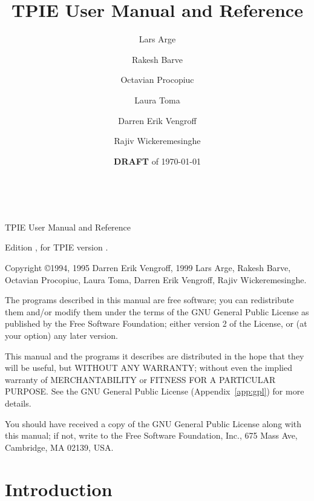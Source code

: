 


\title{TPIE User Manual and Reference}
\author{Lars Arge \and Rakesh Barve \and Octavian Procopiuc \and Laura
Toma\and 
        Darren Erik Vengroff \and Rajiv Wickeremesinghe}
\date{{\bf DRAFT} of \today}

\maketitle

\begin{titlepage}

\mbox{ }

\vspace{\fill}


\noindent TPIE User Manual and Reference

\noindent Edition \edition, for TPIE version \version.

\vspace{2 ex}

\noindent Copyright \copyright 1994, 1995 Darren Erik Vengroff, 1999 Lars
Arge, Rakesh Barve, Octavian Procopiuc, Laura Toma, Darren Erik
Vengroff, Rajiv Wickeremesinghe.

\vspace{2 ex}

The programs described in this manual are free software; you can
redistribute them and/or modify them under the terms of the GNU General
Public License as published by the Free Software Foundation; either
version 2 of the License, or (at your option) any later version.

This manual and the programs it describes are distributed in the hope
that they will be useful, but WITHOUT ANY WARRANTY; without even the
implied warranty of MERCHANTABILITY or FITNESS FOR A PARTICULAR
PURPOSE.  See the GNU General Public License (Appendix~\ref{app:gpl})
for more details.

You should have received a copy of the GNU General Public License
along with this manual; if not, write to the Free Software Foundation,
Inc., 675 Mass Ave, Cambridge, MA 02139, USA.
\end{titlepage}

\tableofcontents

\chapter*{Introduction}

